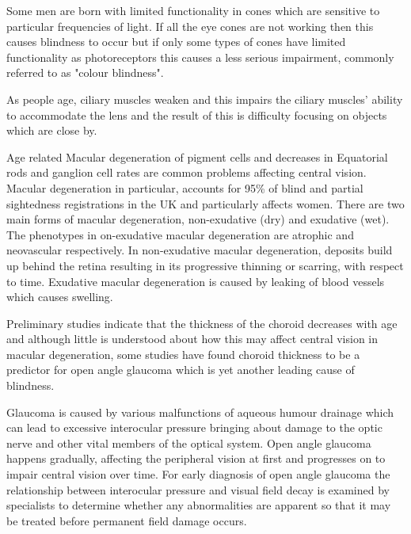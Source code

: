 Some men are born with limited functionality in cones which are
sensitive to particular frequencies of light.\cite{george1996clinical}
If all the eye cones are not working then this causes blindness
to occur but if only some types of cones have limited functionality
as photoreceptors this causes a less serious impairment, commonly
referred to as "colour blindness".

As people age, ciliary muscles weaken and this impairs the ciliary
muscles' ability to accommodate the lens and the result of this is
difficulty focusing on objects which are close by.
\cite{fisher1985ciliary}

Age related Macular degeneration of pigment cells and decreases in
Equatorial rods and ganglion cell rates are common problems affecting
central vision.\cite{gao1992aging} Macular degeneration in particular,
accounts for 95\% of blind and partial sightedness registrations in the
UK and particularly affects women.\cite{o1998age,klein2005complement}
There are two main forms of macular degeneration, non-exudative (dry)
and exudative (wet). The phenotypes in on-exudative macular degeneration
are atrophic and neovascular respectively.\cite{kuno2011dry} In
non-exudative macular degeneration, deposits build up behind the retina
resulting in its progressive thinning or scarring, with respect to time.
Exudative macular degeneration is caused by leaking of blood vessels
which causes swelling.

Preliminary studies indicate that the thickness of the choroid decreases
with age and although little is understood about how this may affect
central vision in macular degeneration, some studies have found
choroid thickness to be a predictor for open angle glaucoma which
is yet another leading cause of blindness.
\cite{margolis2009pilot,gordon2002ocular}

Glaucoma is caused by various malfunctions of aqueous humour drainage
which can lead to excessive interocular pressure bringing about damage
to the optic nerve and other vital members of the optical system.
\cite{distelhorst2003open} Open angle glaucoma happens gradually,
affecting the peripheral vision at first and progresses on to impair
central vision over time. For early diagnosis of open angle glaucoma
the relationship between interocular pressure and visual field decay
is examined by specialists to determine whether any abnormalities are
apparent so that it may be treated before permanent field damage occurs.
\cite{goldmann1972open}

